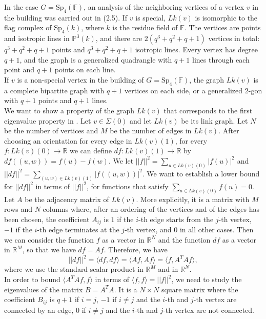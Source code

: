 \documentclass{article}
\theoremstyle{definition}
\theoremstyle{remark}
\theoremstyle{plain}
\begin{document}
In the case $G=\mathrm{Sp}_4(\mathbb{F})$, an analysis of the neighboring vertices of a vertex $v$ in the building was carried out in \cite{zetasp4} (2.5). If $v$ is special, $Lk(v)$ is isomorphic to the flag complex of $\mathrm{Sp}_4(k)$, where $k$ is the residue field of $\mathbb{F}$. The vertices are points and isotropic lines in $\mathbb{P}^3(k)$, and there are $2(q^3+q^2+q+1)$ vertices in total: $q^3+q^2+q+1$ points and $q^3+q^2+q+1$ isotropic lines. Every vertex has degree $q+1$, and the graph is a generalized quadrangle with $q+1$ lines through each point and $q+1$ points on each line. \\

If $v$ is a non-special vertex in the building of $G=\mathrm{Sp}_4(\mathbb{F})$, the graph $Lk(v)$ is a complete bipartite graph with $q+1$ vertices on each side, or a generalized $2$-gon with $q+1$ points and $q+1$ lines. \\

We want to show a property of the graph $Lk(v)$ that corresponds to the first eigenvalue property in \cite{wang}. Let $v\in\Sigma(0)$ and let $Lk(v)$ be its link graph. Let $N$ be the number of vertices and $M$ be the number of edges in $Lk(v)$. After choosing an orientation for every edge in $Lk(v)(1)$, for every $f: Lk(v)(0)\rightarrow\mathbb{R}$ we can define $df: Lk(v)(1)\rightarrow\mathbb{R}$ by $df((u,w))=f(u)-f(w)$. We let $||f||^2=\sum_{u\in Lk(v)(0)}|f(u)|^2$ and $||df||^2=\sum_{(u,w)\in Lk(v)(1)}|f((u,w))|^2$. We want to establish a lower bound for $||df||^2$ in terms of $||f||^2$, for functions that satisfy $\sum_{u\in Lk(v)(0)}{f(u)}=0$. \\

Let $A$ be the adjacency matrix of $Lk(v)$. More explicitly, it is a matrix with $M$ rows and $N$ columns where, after an ordering of the vertices and of the edges has been chosen, the coefficient $A_{ij}$ is $1$ if the $i$-th edge starts from the $j$-th vertex, $-1$ if the $i$-th edge terminates at the $j$-th vertex, and $0$ in all other cases. Then we can consider the function $f$ as a vector in $\mathbb{R}^N$ and the function $df$ as a vector in $\mathbb{R}^M$, so that we have $df=Af$. Therefore, we have $$||df||^2=\langle df,df\rangle=\langle Af,Af\rangle=\langle f,A^TAf\rangle,$$ where we use the standard scalar product in $\mathbb{R}^M$ and in $\mathbb{R}^N$. \\

In order to bound $\langle A^TAf,f\rangle$ in terms of $\langle f,f\rangle=||f||^2$, we need to study the eigenvalues of the matrix $B=A^TA$. It is a $N\times N$ square matrix where the coefficient $B_{ij}$ is $q+1$ if $i=j$, $-1$ if $i\neq j$ and the $i$-th and $j$-th vertex are connected by an edge, $0$ if $i\neq j$ and the $i$-th and $j$-th vertex are not connected. \\
\end{document}
